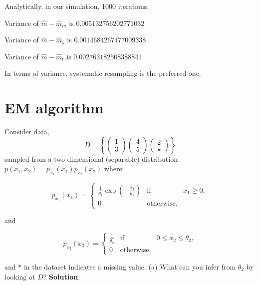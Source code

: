 \documentclass{article}
\begin{document}
Analytically, in our simulation, 1000 iterations.

Variance of $\hat{m}-\hat{m}_m$ is $0.005132756202771032$

Variance of $\hat{m}-\hat{m}_s$ is $0.0014684267477009338$

Variance of $\hat{m}-\hat{m}_t$ is $0.002763182508388841$

In terms of variance, systematic resampling is the preferred one.

\newpage
\section{EM algorithm}
Consider data,
\begin{equation}
    D = \left\{\left( \begin{array}{c}  1 \\  3
    \end{array} \right)
    \left( \begin{array}{c}  4 \\  5
    \end{array} \right)
    \left( \begin{array}{c}  2 \\  \star
    \end{array} \right)\right\}
\end{equation}
sampled from a two-dimensional (separable) distribution $p(x_1,x_2) = p_{x_{1}}(x_{1})p_{x_{2}}(x_{2})$ where:

\begin{equation}
p_{x_1}(x_1) = \left\{\begin{array}{rcl}
\frac{1}{\theta_1} \exp(-\frac{x_1}{\theta_1}) & \mbox{if} & x_1 \geq 0,\\ 
0  & \mbox{otherwise} ,
\end{array}\right. 
\end{equation}

and

\begin{equation}
p_{x_2}(x_2) = \left\{\begin{array}{rcl}
\frac{1}{\theta_2}  & \mbox{if} & 0 \leq x_2 \leq \theta_2,\\ 
0  & \mbox{otherwise} ,
\end{array}\right. 
\end{equation}


and $*$ in the dataset indicates a missing value.
\newline
(a) What can you infer from $\theta_2$ by looking at $D$?
\newline
\textbf{Solution}:
\end{document}
